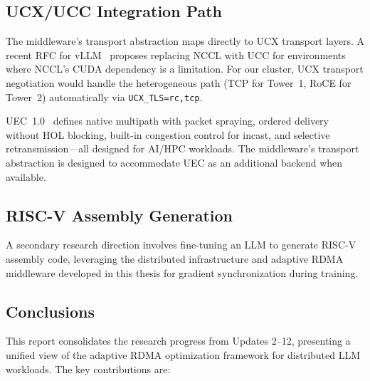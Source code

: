 \documentclass[11pt,letterpaper]{article}
\theoremstyle{definition}
\begin{document}
\subsection{UCX/UCC Integration Path}

The middleware's transport abstraction maps directly to UCX transport layers. A recent RFC for vLLM~\cite{vllm-ucc-rfc} proposes replacing NCCL with UCC for environments where NCCL's CUDA dependency is a limitation. For our cluster, UCX transport negotiation would handle the heterogeneous path (TCP for Tower~1, RoCE for Tower~2) automatically via \texttt{UCX\_TLS=rc,tcp}.

UEC~1.0~\cite{uec2025} defines native multipath with packet spraying, ordered delivery without HOL blocking, built-in congestion control for incast, and selective retransmission---all designed for AI/HPC workloads. The middleware's transport abstraction is designed to accommodate UEC as an additional backend when available.

\subsection{RISC-V Assembly Generation}

A secondary research direction involves fine-tuning an LLM to generate RISC-V assembly code, leveraging the distributed infrastructure and adaptive RDMA middleware developed in this thesis for gradient synchronization during training.

\subsection{Conclusions}

This report consolidates the research progress from Updates 2--12, presenting a unified view of the adaptive RDMA optimization framework for distributed LLM workloads. The key contributions are:
\end{document}
